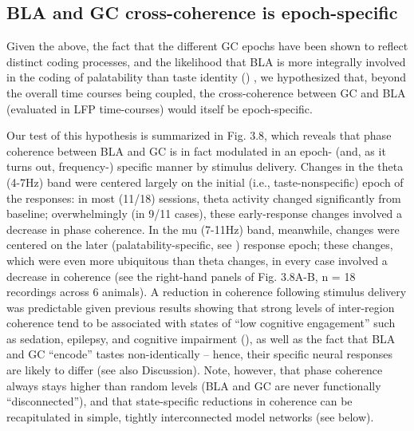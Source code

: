\begin{refsection}
\subsection{BLA and GC cross-coherence is epoch-specific}
Given the above, the fact that the different GC epochs have been shown to reflect distinct coding processes, and the likelihood that BLA is more integrally involved in the coding of palatability than taste identity (\cite{piette2012a,lin2021a}) , we hypothesized that, beyond the overall time courses being coupled, the cross-coherence between GC and BLA (evaluated in LFP time-courses) would itself be epoch-specific. 

Our test of this hypothesis is summarized in Fig. 3.8, which reveals that phase coherence between BLA and GC is in fact modulated in an epoch- (and, as it turns out, frequency-) specific manner by stimulus delivery. Changes in the theta (4-7Hz) band were centered largely on the initial (i.e., taste-nonspecific) epoch of the responses: in most (11/18) sessions, theta activity changed significantly from baseline; overwhelmingly (in 9/11 cases), these early-response changes involved a decrease in phase coherence. In the mu (7-11Hz) band, meanwhile, changes were centered on the later (palatability-specific, see \cite{katz2001a,sadacca2012a}) response epoch; these changes, which were even more ubiquitous than theta changes, in every case involved a decrease in coherence (see the right-hand panels of Fig. 3.8A-B, n = 18 recordings across 6 animals). A reduction in coherence following stimulus delivery was predictable given previous results showing that strong levels of inter-region coherence tend to be associated with states of “low cognitive engagement” such as sedation, epilepsy, and cognitive impairment (\cite{supp2011a,martinet2017a,arbab2018a}), as well as the fact that BLA and GC “encode” tastes non-identically – hence, their specific neural responses are likely to differ (see also Discussion). Note, however, that phase coherence always stays higher than random levels (BLA and GC are never functionally “disconnected”), and that state-specific reductions in coherence can be recapitulated in simple, tightly interconnected model networks (see below). 


\end{refsection}
